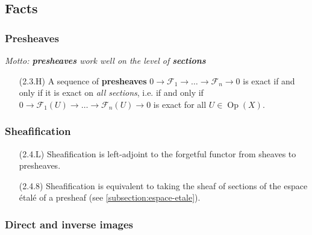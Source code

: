 \documentclass[10pt]{article}
\DeclareMathOperator{\Op}{Op}
\newcommand{\fsheaf}{\mathcal{F}}
\begin{document}
        \subsection{Facts}\label{subsection:sheaves-facts}
        
            \subsubsection{Presheaves}
            
                \textit{Motto: \textbf{presheaves} work well on the level of \textbf{sections}}
            
                \begin{itemize}
                    \item[(2.3.H)] A sequence of \textbf{presheaves} $0\to\fsheaf_1\to\ldots\to\fsheaf_n\to0$ is exact if and only if it is exact on \textit{all sections}, i.e. if and only if $0\to\fsheaf_1(U)\to\ldots\to\fsheaf_n(U)\to0$ is exact for all $U\in\Op(X)$.
                \end{itemize}
                
            \subsubsection{Sheafification}
            
                \begin{itemize}
                    \item[(2.4.L)] Sheafification is left-adjoint to the forgetful functor from sheaves to presheaves.
                    \item[(2.4.8)] Sheafification is equivalent to taking the sheaf of sections of the espace étalé of a presheaf (see \cref{subsection:espace-etale}).
                \end{itemize}
                
            \subsubsection{Direct and inverse images}\label{subsubsection:direct-inverse-images}
            
\end{document}
